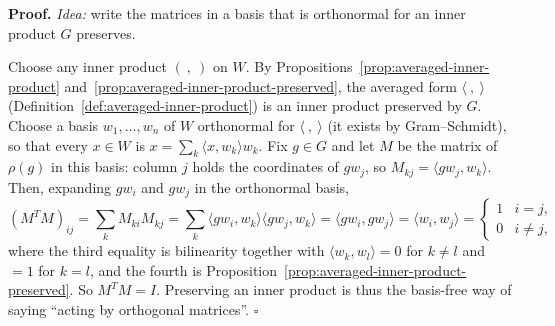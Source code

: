 \documentclass[11pt]{report}
\renewenvironment{proof}[1][Proof]{\noindent\textbf{#1.} }{\hfill$\square$\par\vspace{5pt}}
\begin{document}
\begin{proof}
\textit{Idea:} write the matrices in a basis that is orthonormal for an inner product $G$ preserves.\par
Choose any inner product $(\ ,\ )$ on $W$. By Propositions~\ref{prop:averaged-inner-product} and~\ref{prop:averaged-inner-product-preserved}, the averaged form $\langle\ ,\ \rangle$ (Definition~\ref{def:averaged-inner-product}) is an inner product preserved by $G$. Choose a basis $w_1, \ldots, w_n$ of $W$ orthonormal for $\langle\ ,\ \rangle$ (it exists by Gram--Schmidt), so that every $x \in W$ is $x = \sum_k \langle x, w_k \rangle w_k$. Fix $g \in G$ and let $M$ be the matrix of $\rho(g)$ in this basis: column $j$ holds the coordinates of $gw_j$, so $M_{kj} = \langle gw_j, w_k \rangle$. Then, expanding $gw_i$ and $gw_j$ in the orthonormal basis,
\[ (M^TM)_{ij} = \sum_k M_{ki} M_{kj} = \sum_k \langle gw_i, w_k \rangle \langle gw_j, w_k \rangle = \langle gw_i, gw_j \rangle = \langle w_i, w_j \rangle = \begin{cases} 1 & i = j, \\ 0 & i \neq j, \end{cases} \]
where the third equality is bilinearity together with $\langle w_k, w_l \rangle = 0$ for $k \neq l$ and $= 1$ for $k = l$, and the fourth is Proposition~\ref{prop:averaged-inner-product-preserved}. So $M^TM = I$. Preserving an inner product is thus the basis-free way of saying ``acting by orthogonal matrices''.
\end{proof}
\end{document}
